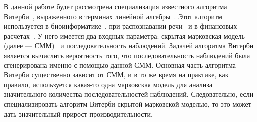 В данной работе будет рассмотрена специализация известного алгоритма Витерби~\cite{Viterbi}, выраженного в терминах линейной алгебры~\cite{LA_Viterbi}. 
Этот алгоритм используется в биоинформатике~\cite{cudampf}, при распознавании речи~\cite{Rabiner_VA} и в финансовых расчетах~\cite{Viterbi_credit}. 
У него имеется два входных параметра: скрытая марковская модель (далее --- СММ)~\cite{Eddy_HMM} и последовательность наблюдений. 
Задачей алгоритма Витерби является вычислить  вероятность того, что последовательность наблюдений была сгенерирована именно с помощью данной СММ. 
Основная часть алгоритма Витерби существенно зависит от СММ, и в то же время на практике, как правило, используется какая-то одна марковская модель для анализа значительного количества последовательностей наблюдений. 
Следовательно, если  специализировать алгоритм Витерби скрытой марковской моделью, то это может дать значительный прирост производительности.